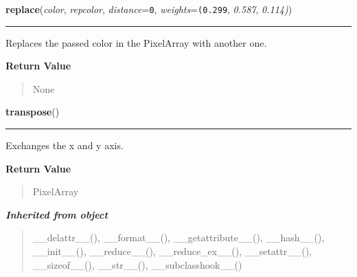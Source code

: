 \hspace{.8\funcindent}\begin{boxedminipage}{\funcwidth}

    \raggedright \textbf{replace}(\textit{color}, \textit{repcolor}, \textit{distance}={\tt 0}, \textit{weights}={\tt (0.299}, \textit{0.587}, \textit{0.114)})

    \vspace{-1.5ex}

    \rule{\textwidth}{0.5\fboxrule}
\setlength{\parskip}{2ex}
    Replaces the passed color in the PixelArray with another one.

\setlength{\parskip}{1ex}
      \textbf{Return Value}
    \vspace{-1ex}

      \begin{quote}
      None

      \end{quote}

    \end{boxedminipage}

    \label{pygame:PixelArray:transpose}

    \vspace{0.5ex}

\hspace{.8\funcindent}\begin{boxedminipage}{\funcwidth}

    \raggedright \textbf{transpose}()

    \vspace{-1.5ex}

    \rule{\textwidth}{0.5\fboxrule}
\setlength{\parskip}{2ex}
    Exchanges the x and y axis.

\setlength{\parskip}{1ex}
      \textbf{Return Value}
    \vspace{-1ex}

      \begin{quote}
      PixelArray

      \end{quote}

    \end{boxedminipage}


\large{\textbf{\textit{Inherited from object}}}

\begin{quote}
\_\_delattr\_\_(), \_\_format\_\_(), \_\_getattribute\_\_(), \_\_hash\_\_(), \_\_init\_\_(), \_\_reduce\_\_(), \_\_reduce\_ex\_\_(), \_\_setattr\_\_(), \_\_sizeof\_\_(), \_\_str\_\_(), \_\_subclasshook\_\_()
\end{quote}

